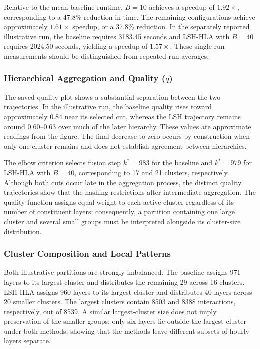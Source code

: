 Relative to the mean baseline runtime, $B=10$ achieves a speedup of $1.92\times$, corresponding to a 47.8\% reduction in time. The remaining configurations achieve approximately $1.61\times$ speedup, or a 37.8\% reduction. In the separately reported illustrative run, the baseline requires 3183.45 seconds and LSH-HLA with $B=40$ requires 2024.50 seconds, yielding a speedup of $1.57\times$. These single-run measurements should be distinguished from repeated-run averages.

\subsubsection*{Hierarchical Aggregation and Quality ($q$)}
The saved quality plot shows a substantial separation between the two trajectories. In the illustrative run, the baseline quality rises toward approximately 0.84 near its selected cut, whereas the LSH trajectory remains around 0.60--0.63 over much of the later hierarchy. These values are approximate readings from the figure. The final decrease to zero occurs by construction when only one cluster remains and does not establish agreement between hierarchies.

The elbow criterion selects fusion step $k^*=983$ for the baseline and $k^*=979$ for LSH-HLA with $B=40$, corresponding to 17 and 21 clusters, respectively. Although both cuts occur late in the aggregation process, the distinct quality trajectories show that the hashing restrictions alter intermediate aggregation. The quality function assigns equal weight to each active cluster regardless of its number of constituent layers; consequently, a partition containing one large cluster and several small groups must be interpreted alongside its cluster-size distribution.

\subsubsection*{Cluster Composition and Local Patterns}
Both illustrative partitions are strongly imbalanced. The baseline assigns 971 layers to its largest cluster and distributes the remaining 29 across 16 clusters. LSH-HLA assigns 960 layers to its largest cluster and distributes 40 layers across 20 smaller clusters. The largest clusters contain 8503 and 8388 interactions, respectively, out of 8539. A similar largest-cluster size does not imply preservation of the smaller groups: only six layers lie outside the largest cluster under both methods, showing that the methods leave different subsets of hourly layers separate.

